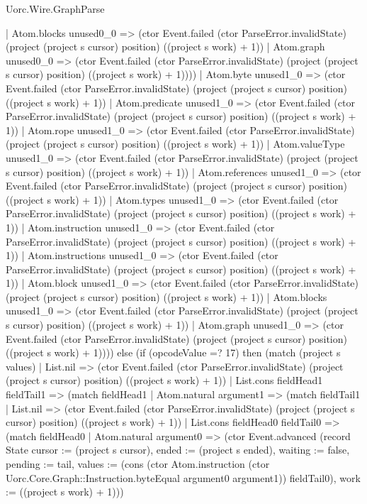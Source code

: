 \begin{lexlean}{Uorc.Wire.GraphParse}
\begin{semanticmodule}
{              | Atom.blocks unused0_0 => (ctor Event.failed (ctor ParseError.invalidState) (project (project s cursor) position) ((project s work) + 1))
              | Atom.graph unused0_0 => (ctor Event.failed (ctor ParseError.invalidState) (project (project s cursor) position) ((project s work) + 1))))
          | Atom.byte unused1_0 => (ctor Event.failed (ctor ParseError.invalidState) (project (project s cursor) position) ((project s work) + 1))
          | Atom.predicate unused1_0 => (ctor Event.failed (ctor ParseError.invalidState) (project (project s cursor) position) ((project s work) + 1))
          | Atom.rope unused1_0 => (ctor Event.failed (ctor ParseError.invalidState) (project (project s cursor) position) ((project s work) + 1))
          | Atom.valueType unused1_0 => (ctor Event.failed (ctor ParseError.invalidState) (project (project s cursor) position) ((project s work) + 1))
          | Atom.references unused1_0 => (ctor Event.failed (ctor ParseError.invalidState) (project (project s cursor) position) ((project s work) + 1))
          | Atom.types unused1_0 => (ctor Event.failed (ctor ParseError.invalidState) (project (project s cursor) position) ((project s work) + 1))
          | Atom.instruction unused1_0 => (ctor Event.failed (ctor ParseError.invalidState) (project (project s cursor) position) ((project s work) + 1))
          | Atom.instructions unused1_0 => (ctor Event.failed (ctor ParseError.invalidState) (project (project s cursor) position) ((project s work) + 1))
          | Atom.block unused1_0 => (ctor Event.failed (ctor ParseError.invalidState) (project (project s cursor) position) ((project s work) + 1))
          | Atom.blocks unused1_0 => (ctor Event.failed (ctor ParseError.invalidState) (project (project s cursor) position) ((project s work) + 1))
          | Atom.graph unused1_0 => (ctor Event.failed (ctor ParseError.invalidState) (project (project s cursor) position) ((project s work) + 1)))) else (if (opcodeValue =? 17) then (match (project s values)
        | List.nil => (ctor Event.failed (ctor ParseError.invalidState) (project (project s cursor) position) ((project s work) + 1))
        | List.cons fieldHead1 fieldTail1 => (match fieldHead1
          | Atom.natural argument1 => (match fieldTail1
            | List.nil => (ctor Event.failed (ctor ParseError.invalidState) (project (project s cursor) position) ((project s work) + 1))
            | List.cons fieldHead0 fieldTail0 => (match fieldHead0
              | Atom.natural argument0 => (ctor Event.advanced (record State {cursor := (project s cursor), ended := (project s ended), waiting := false, pending := tail, values := (cons (ctor Atom.instruction (ctor Uorc.Core.Graph::Instruction.byteEqual argument0 argument1)) fieldTail0), work := ((project s work) + 1)}))
}
\end{semanticmodule}
\end{lexlean}
